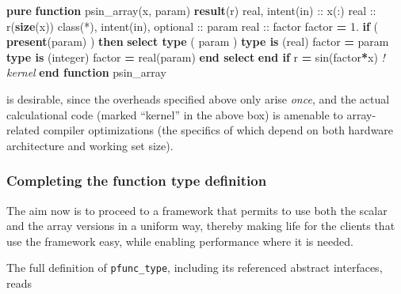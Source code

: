 \documentclass[
  paper=a4,
  ,captions=tableheading
]{scrartcl}
\newenvironment{Shaded}{\begin{snugshade}}{\end{snugshade}}
\newcommand{\BuiltInTok}[1]{#1}
\newcommand{\CommentTok}[1]{\textcolor[rgb]{0.56,0.35,0.01}{\textit{#1}}}
\newcommand{\DataTypeTok}[1]{\textcolor[rgb]{0.13,0.29,0.53}{#1}}
\newcommand{\FloatTok}[1]{\textcolor[rgb]{0.00,0.00,0.81}{#1}}
\newcommand{\FunctionTok}[1]{\textcolor[rgb]{0.13,0.29,0.53}{\textbf{#1}}}
\newcommand{\KeywordTok}[1]{\textcolor[rgb]{0.13,0.29,0.53}{\textbf{#1}}}
\newcommand{\NormalTok}[1]{#1}
\begin{document}
\begin{Shaded}
\begin{Highlighting}[]
\KeywordTok{pure} \KeywordTok{function}\NormalTok{ psin\_array(x, param) }\KeywordTok{result}\NormalTok{(r)}
  \DataTypeTok{real}\NormalTok{, }\DataTypeTok{intent(in)} \DataTypeTok{::}\NormalTok{ x(:)}
  \DataTypeTok{real} \DataTypeTok{::}\NormalTok{ r(}\FunctionTok{size}\NormalTok{(x))}
  \DataTypeTok{class(*)}\NormalTok{, }\DataTypeTok{intent(in)}\NormalTok{, }\DataTypeTok{optional} \DataTypeTok{::}\NormalTok{ param}
  \DataTypeTok{real} \DataTypeTok{::}\NormalTok{ factor}
\NormalTok{  factor }\KeywordTok{=} \FloatTok{1.}
  \KeywordTok{if}\NormalTok{ ( }\FunctionTok{present}\NormalTok{(param) ) }\KeywordTok{then}
    \KeywordTok{select type}\NormalTok{ ( param )}
     \KeywordTok{type is}\NormalTok{ (}\DataTypeTok{real}\NormalTok{)}
\NormalTok{      factor }\KeywordTok{=}\NormalTok{ param}
     \KeywordTok{type is}\NormalTok{ (}\DataTypeTok{integer}\NormalTok{)}
\NormalTok{      factor }\KeywordTok{=} \DataTypeTok{real(param)}
    \KeywordTok{end select}
  \KeywordTok{end if}
\NormalTok{  r }\KeywordTok{=} \BuiltInTok{sin}\NormalTok{(factor}\KeywordTok{*}\NormalTok{x)  }\CommentTok{! kernel}
\KeywordTok{end function}\NormalTok{ psin\_array}
\end{Highlighting}
\end{Shaded}

is desirable, since the overheads specified above only arise
\emph{once}, and the actual calculational code (marked ``kernel'' in the
above box) is amenable to array-related compiler optimizations (the
specifics of which depend on both hardware architecture and working set
size).

\subsubsection{Completing the function type
definition}\label{completing-the-function-type-definition}

The aim now is to proceed to a framework that permits to use both the
scalar and the array versions in a uniform way, thereby making life for
the clients that use the framework easy, while enabling performance
where it is needed.

The full definition of \texttt{pfunc\_type}, including its referenced
abstract interfaces, reads
\end{document}
